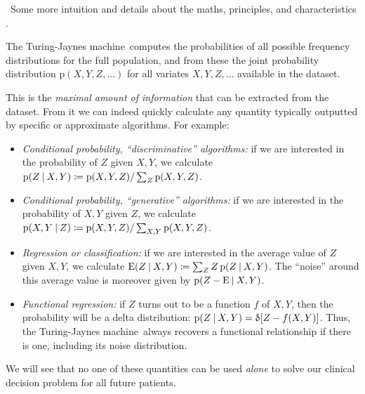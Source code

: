 \documentclass[utf8]{FrontiersinHarvard} %
\newcommand*{\pencil}{{\fontencoding{U}\fontfamily{fontawesometwo}\selectfont\symbol{210}}}
\newcommand{\mynotep}[1]{{\color{notecolour}\pencil\ #1}}
\newcommand*{\p}{\mathrm{p}}%
\newcommand*{\E}{\mathrm{E}}
\renewcommand*{\|}[1][]{\nonscript\:#1\vert\nonscript\:\mathopen{}}
\newcommand*{\defd}{\coloneqq}
\newcommand*{\delt}{\updelta}
\newcommand*{\tjm}{Turing-Jaynes machine}
\begin{document}
\mynotep{Some more intuition and details about the maths, principles, and characteristics} \citep{dunsonetal2011,rossi2014,rasmussen1999}.

The \tjm\ computes the probabilities of all possible frequency distributions for the full population, and from these the joint probability distribution $\p(X,Y,Z,\dotsc)$ for all variates $X,Y,Z,\dotsc$ available in the dataset.

This is the\emph{ maximal amount of information} that can be extracted from the dataset. From it we can indeed quickly calculate any quantity typically outputted by specific or approximate algorithms. For example:
\begin{itemize}
\item \emph{Conditional probability, \enquote{discriminative} algorithms:} if we are interested in the probability of $Z$ given $X,Y$, we calculate $\p(Z \| X,Y) \defd \p(X,Y,Z)/\sum_{Z}\p(X,Y,Z)$.
\item \emph{Conditional probability, \enquote{generative} algorithms:} if we are interested in the probability of $X,Y$ given $Z$, we calculate $\p(X,Y\|Z) \defd \p(X,Y,Z)/\sum_{X,Y}\p(X,Y,Z)$.
\item \emph{Regression or classification:} if we are interested in the average value of $Z$ given $X,Y$, we calculate $\E(Z \| X,Y) \defd \sum_{Z}Z\,\p(Z\|X,Y)$. The \enquote{noise} around this average value is moreover given by $\p(Z-\E\|X,Y)$.
\item \emph{Functional regression:} if $Z$ turns out to be a function $f$ of $X,Y$, then the probability will be a delta distribution: $\p(Z\|X,Y) = \delt[Z-f(X,Y)]$.
  Thus, the \tjm\ always recovers a functional relationship if there is one, including its noise distribution.
\end{itemize}
We will see that no one of these quantities can be used \emph{alone} to solve our clinical decision problem for all future patients.
\end{document}

